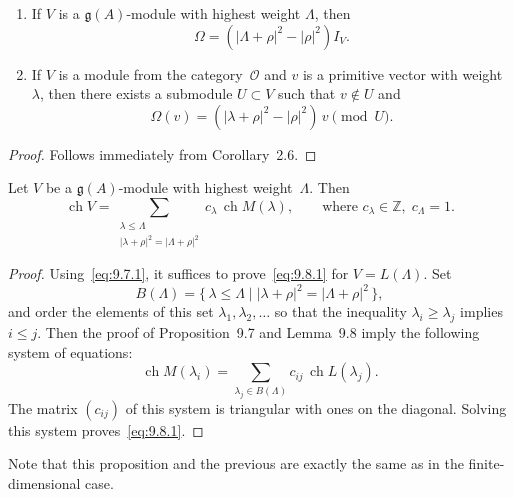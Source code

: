 \documentclass[12pt]{article}
\begin{document}
\begin{lemma}[9.8]
    \leavevmode
    \begin{enumerate}[label=\textup{(\alph*)}]
        \item
              If $V$ is a $\mathfrak{g}(A)$-module with highest weight $\Lambda$, then
              \[
                  \Omega = (|\Lambda + \rho|^2 - |\rho|^2) I_V.
              \]

        \item
              If $V$ is a module from the category~$\mathcal{O}$ and $v$ is a primitive vector with weight~$\lambda$,
              then there exists a submodule $U \subset V$ such that $v \notin U$ and
              \[
                  \Omega(v) = (|\lambda + \rho|^2 - |\rho|^2)\, v \pmod{U}.
              \]
    \end{enumerate}

    \begin{proof}
        Follows immediately from Corollary~2.6.
    \end{proof}
\end{lemma}

\begin{proposition}[9.8]
    Let $V$ be a $\mathfrak{g}(A)$-module with highest weight~$\Lambda$. Then
    \begin{equation}\label{eq:9.8.1}
        \operatorname{ch} V
        = \sum_{\substack{\lambda \le \Lambda \\ |\lambda + \rho|^2 = |\Lambda + \rho|^2}}
        c_\lambda \, \operatorname{ch} M(\lambda),
        \qquad
        \text{where } c_\lambda \in \mathbb{Z}, \; c_\Lambda = 1.
    \end{equation}
\end{proposition}

\begin{proof}
    Using~\eqref{eq:9.7.1}, it suffices to prove~\eqref{eq:9.8.1} for $V = L(\Lambda)$.
    Set
    \[
        B(\Lambda)
        = \{\, \lambda \le \Lambda \mid |\lambda + \rho|^2 = |\Lambda + \rho|^2 \,\},
    \]
    and order the elements of this set $\lambda_1, \lambda_2, \dots$
    so that the inequality $\lambda_i \ge \lambda_j$ implies $i \le j$.
    Then the proof of Proposition~9.7 and Lemma~9.8 imply the following
    system of equations:
    \[
        \operatorname{ch} M(\lambda_i)
        = \sum_{\lambda_j \in B(\Lambda)} c_{ij}\, \operatorname{ch} L(\lambda_j).
    \]
    The matrix $(c_{ij})$ of this system is triangular with ones on the diagonal.
    Solving this system proves~\eqref{eq:9.8.1}.
\end{proof}
Note that this proposition and the previous are exactly the same as in the finite-dimensional case.
\end{document}
